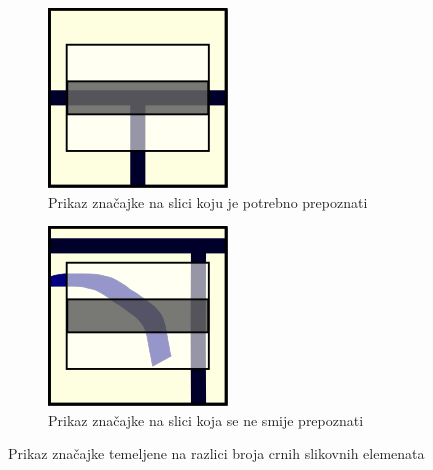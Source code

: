 \documentclass[times, utf8, zavrsni, numeric]{fer}
\begin{document}
\begin{figure}[th!]
    \centering
    \begin{subfigure}{.5\textwidth}
        \centering
        \includegraphics[width=.45\linewidth]{Images/Feature_true_4.png}
        \captionsetup{justification=centering}
        \caption{Prikaz značajke na slici koju je potrebno prepoznati}
        \label{fig:featureDemo4a}
    \end{subfigure}%
    \begin{subfigure}{.5\textwidth}
        \centering
        \includegraphics[width=.45\linewidth]{Images/Feature_false_4.png}
        \caption{Prikaz značajke na slici koja se ne smije prepoznati}
        \label{fig:featureDemo4b}
    \end{subfigure}
    \caption{Prikaz značajke temeljene na razlici broja crnih slikovnih elemenata}
    \label{fig:featureDemo4}
\end{figure}
\end{document}
